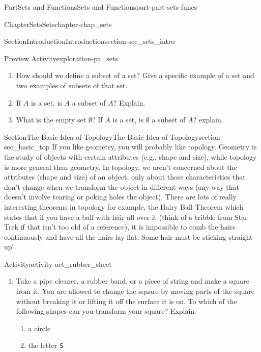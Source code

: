 \documentclass[oneside,10pt,]{book}
\newcommand{\mono}[1]{\texttt{#1}}
\numberwithin{equation}{chapter}
\begin{document}
\begin{partptx}{Part}{Sets and Functions}{}{Sets and Functions}{}{}{part-part-sets-funcs}
\begin{chapterptx}{Chapter}{Sets}{}{Sets}{}{}{chapter-chap_sets}
\begin{sectionptx}{Section}{Introduction}{}{Introduction}{}{}{section-sec_sets_intro}
\begin{exploration}{Preview Activity}{}{exploration-pa_sets}
\begin{enumerate}[font=\bfseries,label=(\alph*),ref=\alph*]
\begin{enumerate}[font=\bfseries,label=(\roman*),ref=\theenumi.\roman*]%
\item{}How should we define a subset of a set? Give a specific example of a set and two examples of subsets of that set.%
\item{}If \(A\) is a set, is \(A\) a subset of \(A\)? Explain.%
\item{}What is the empty set \(\emptyset\)? If \(A\) is a set, is \(\emptyset\) a subset of \(A\)? explain.%
\end{enumerate}%
\end{enumerate}%
\end{exploration}%
\end{sectionptx}
%
%
\typeout{************************************************}
\typeout{************************************************}
%
\begin{sectionptx}{Section}{The Basic Idea of Topology}{}{The Basic Idea of Topology}{}{}{section-sec_basic_top}
If you like geometry, you will probably like topology. Geometry is the study of objects with certain attributes (e.g., shape and size), while topology is more general than geometry. In topology, we aren't concerned about the attributes (shape and size) of an object, only about those characteristics that don't change when we transform the object in different ways (any way that doesn't involve tearing or poking holes the object). There are lots of really interesting theorems in topology \textemdash{} for example, the Hairy Ball Theorem which states that if you have a ball with hair all over it (think of a tribble from Star Trek \textemdash{} if that isn't too old of a reference), it is impossible to comb the hairs continuously and have all the hairs lay flat. Some hair must be sticking straight up!%
\begin{activity}{Activity}{}{activity-act_rubber_sheet}%
\begin{enumerate}[font=\bfseries,label=(\alph*),ref=\alph*]%
\item{}Take a pipe cleaner, a rubber band, or a piece of string and make a square from it. You are allowed to change the square by moving parts of the square without breaking it or lifting it off the surface it is on. To which of the following shapes can you transform your square? Explain.%
\begin{enumerate}[font=\bfseries,label=(\roman*),ref=\theenumi.\roman*]%
\item{}a circle%
\item{}the letter \mono{S}%

\end{enumerate}
\end{enumerate}
\end{activity}
\end{sectionptx}
\end{chapterptx}
\end{partptx}
\end{document}
